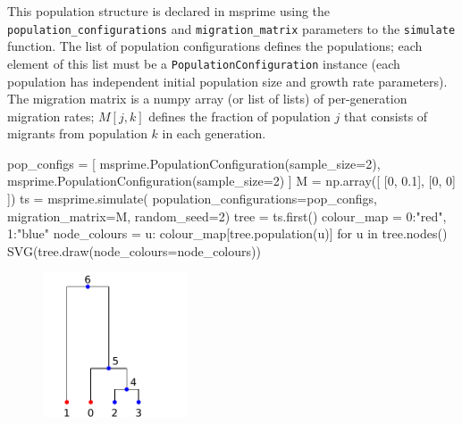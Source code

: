 \documentclass[graybox]{svmult}
\newcommand{\includenbimage}[1]{\begin{center}\texttt{[image: \#1]}\end{center}}
\begin{document}
This population structure is declared in msprime using the
\texttt{population\_configurations} and \texttt{migration\_matrix}
parameters to the \texttt{simulate} function. The list of population
configurations defines the populations; each element of this list must
be a \texttt{PopulationConfiguration} instance (each population has
independent initial population size and growth rate parameters). The
migration matrix is a numpy array (or list of lists) of per-generation
migration rates; \(M[j,k]\) defines the fraction of population \(j\)
that consists of migrants from population \(k\) in each generation.

\begin{pythoncode}
pop_configs = [
    msprime.PopulationConfiguration(sample_size=2),
    msprime.PopulationConfiguration(sample_size=2)
]
M = np.array([
    [0, 0.1],
    [0, 0]
])
ts  = msprime.simulate(
    population_configurations=pop_configs, migration_matrix=M,
    random_seed=2)
tree = ts.first()
colour_map = {0:"red", 1:"blue"}
node_colours = {
    u: colour_map[tree.population(u)] for u in tree.nodes()}
SVG(tree.draw(node_colours=node_colours))
\end{pythoncode}

\begin{figure}
  \begin{center}
    \includegraphics[width=0.38\textwidth]{images/simulations_26_0}
  \end{center}
\end{figure}
%
\end{document}

